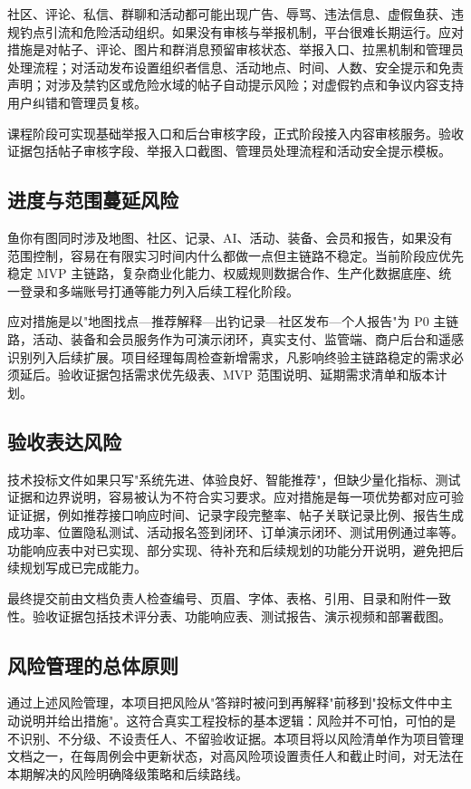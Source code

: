 社区、评论、私信、群聊和活动都可能出现广告、辱骂、违法信息、虚假鱼获、违规钓点引流和危险活动组织。如果没有审核与举报机制，平台很难长期运行。应对措施是对帖子、评论、图片和群消息预留审核状态、举报入口、拉黑机制和管理员处理流程；对活动发布设置组织者信息、活动地点、时间、人数、安全提示和免责声明；对涉及禁钓区或危险水域的帖子自动提示风险；对虚假钓点和争议内容支持用户纠错和管理员复核。

课程阶段可实现基础举报入口和后台审核字段，正式阶段接入内容审核服务。验收证据包括帖子审核字段、举报入口截图、管理员处理流程和活动安全提示模板。

\subsection{进度与范围蔓延风险}

鱼你有图同时涉及地图、社区、记录、AI、活动、装备、会员和报告，如果没有范围控制，容易在有限实习时间内什么都做一点但主链路不稳定。当前阶段应优先稳定 MVP 主链路，复杂商业化能力、权威规则数据合作、生产化数据底座、统一登录和多端账号打通等能力列入后续工程化阶段。

应对措施是以"地图找点—推荐解释—出钓记录—社区发布—个人报告"为 P0 主链路，活动、装备和会员服务作为可演示闭环，真实支付、监管端、商户后台和遥感识别列入后续扩展。项目经理每周检查新增需求，凡影响终验主链路稳定的需求必须延后。验收证据包括需求优先级表、MVP 范围说明、延期需求清单和版本计划。

\subsection{验收表达风险}

技术投标文件如果只写"系统先进、体验良好、智能推荐"，但缺少量化指标、测试证据和边界说明，容易被认为不符合实习要求。应对措施是每一项优势都对应可验证证据，例如推荐接口响应时间、记录字段完整率、帖子关联记录比例、报告生成成功率、位置隐私测试、活动报名签到闭环、订单演示闭环、测试用例通过率等。功能响应表中对已实现、部分实现、待补充和后续规划的功能分开说明，避免把后续规划写成已完成能力。

最终提交前由文档负责人检查编号、页眉、字体、表格、引用、目录和附件一致性。验收证据包括技术评分表、功能响应表、测试报告、演示视频和部署截图。

\subsection{风险管理的总体原则}

通过上述风险管理，本项目把风险从"答辩时被问到再解释"前移到"投标文件中主动说明并给出措施"。这符合真实工程投标的基本逻辑：风险并不可怕，可怕的是不识别、不分级、不设责任人、不留验收证据。本项目将以风险清单作为项目管理文档之一，在每周例会中更新状态，对高风险项设置责任人和截止时间，对无法在本期解决的风险明确降级策略和后续路线。
